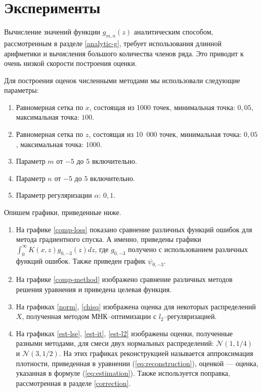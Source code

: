 \documentclass[../paper.tex]{subfiles}
\begin{document}
\section{Эксперименты}
%
Вычисление значений функции $g_{m,n}(z)$ аналитическим способом, рассмотренным в разделе \ref{analytic-g}, требует использования длинной арифметики
и вычисления большого количества членов ряда. Это приводит к очень низкой скорости построения оценки. 

Для построения оценок численными методами мы использовали следующие параметры:
\begin{enumerate}
	\item Равномерная сетка по $x$, состоящая из 1000 точек, минимальная точка: $0{,}05$, максимальная точка: $100$.
	\item Равномерная сетка по $z$, состоящая из 10~000 точек, минимальная точка: $0{,}05$, максимальная точка: $1000$.
	\item Параметр $m$ от $-5$ до $5$ включительно.
	\item Параметр $n$ от $-5$ до $5$ включительно.
	\item Параметр регуляризации $\alpha$: $0{,}1$.
\end{enumerate}

Опишем графики, приведенные ниже.
\begin{enumerate}
	\item На графике \ref{comp-loss} показано сравнение различных функций ошибок для метода градиентного спуска.
		А именно, приведены графики $\int_0^\infty K(x,z)g_{0,-3}(z)dz$, где $g_{0,-3}$ получено с использованием различных функций ошибок.
		Также приведен график $\psi_{0,-3}$.
	\item На графике \ref{comp-method} изображено сравнение различных методов решения уравнения и приведена целевая функция.
	\item На графиках \ref{norm}, \ref{chisq} изображена оценка для некоторых распределений $X$, полученная методом МНК--оптимизации с $l_2$--регуляризацией.
	\item На графиках \ref{est-lse}, \ref{est-it}, \ref{est-l2} изображены оценки, 
		полученные разными методами, для смеси двух нормальных распределений: $\mathcal{N}(1, 1/4)$ и $\mathcal{N}(3, 1/2)$.
		На этих графиках реконструкцией называется аппроксимация плотности, приведенная в уравнении (\ref{eq:reconstruction}), оценкой --- оценка, указанная в формуле (\ref{eq:estimation}). Также используется поправка, рассмотренная в разделе \ref{correction}.
\end{enumerate}
\end{document}
